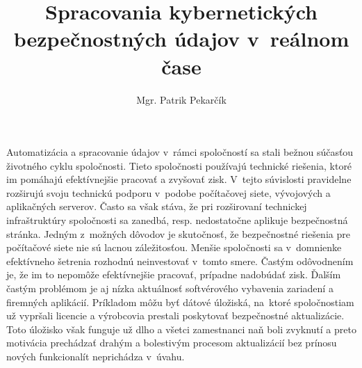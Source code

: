 \documentclass[thesismargins, thesislinespacing, openright, upjsfrontpage]{rnthesis}
\title{Spracovania kybernetických bezpečnostných údajov v reálnom čase}
\author{Mgr. Patrik Pekarčík}
\begin{document}
\maketitle
\tableofcontents

\uvod



% 

Automatizácia a spracovanie údajov v~rámci spoločností sa stali bežnou súčasťou životného cyklu spoločnosti. Tieto spoločnosti používajú technické riešenia, ktoré im pomáhajú efektívnejšie pracovať a zvyšovať zisk. V~tejto súvislosti pravidelne rozširujú svoju technickú podporu v~podobe počítačovej siete, vývojových a aplikačných serverov. Často sa však stáva, že pri rozširovaní technickej infraštruktúry spoločnosti sa zanedbá, resp. nedostatočne aplikuje bezpečnostná stránka. Jedným z~možných dôvodov je skutočnosť, že bezpečnostné riešenia pre počítačové siete nie sú lacnou záležitosťou. Menšie spoločnosti sa v~domnienke efektívneho šetrenia rozhodnú neinvestovať v~tomto smere. Častým odôvodnením je, že im to nepomôže efektívnejšie pracovať, prípadne nadobúdať zisk. Ďalším častým problémom je aj nízka aktuálnosť softvérového vybavenia zariadení a firemných aplikácií. Príkladom môžu byť dátové úložiská, na~ktoré spoločnostiam už vypršali licencie a výrobcovia prestali poskytovať bezpečnostné aktualizácie. Toto úložisko však funguje už dlho a všetci zamestnanci naň boli zvyknutí a preto motivácia prechádzať drahým a bolestivým procesom aktualizácií bez prínosu nových funkcionalít neprichádza v~úvahu.
\end{document}
